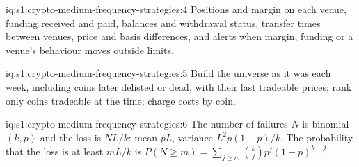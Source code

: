 \begin{solution}{iq:s1:crypto-medium-frequency-strategies:4}
Positions and margin on each venue, funding received and paid, balances and withdrawal status, transfer times between venues, price and basis
differences, and alerts when margin, funding or a venue's behaviour moves outside limits.
\end{solution}

\begin{solution}{iq:s1:crypto-medium-frequency-strategies:5}
Build the universe as it was each week, including coins later delisted or dead, with their last tradeable prices; rank only coins tradeable at the time;
charge costs by coin.
\end{solution}

\begin{solution}{iq:s1:crypto-medium-frequency-strategies:6}
The number of failures $N$ is binomial$(k, p)$ and the loss is $NL/k$: mean $pL$, variance $L^2p(1 - p)/k$. The probability that the loss is at least
$mL/k$ is $P(N \ge m) = \sum_{j \ge m}\binom{k}{j}p^j(1 - p)^{k - j}$.
\end{solution}
